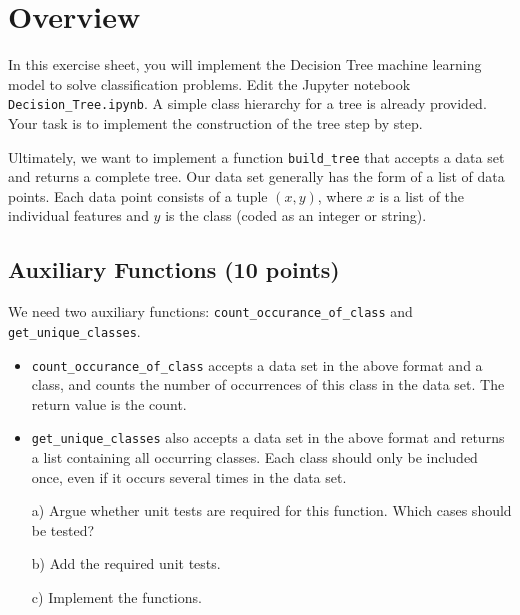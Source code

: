 \def\firstname{Tim}
\def\lastname{Dahmen}
\def\aufgabenblatt{2}




\thispagestyle{page1} 

\section{Overview}

In this exercise sheet, you will implement the Decision Tree machine learning model to solve classification problems. 
Edit the Jupyter notebook \texttt{Decision\_Tree.ipynb}. A simple class hierarchy for a tree is already provided.
Your task is to implement the construction of the tree step by step. 

Ultimately, we want to implement a function \texttt{build\_tree} that accepts a data set and returns a complete tree. 
Our data set generally has the form of a list of data points. Each data point consists of a tuple $(x,y)$, where $x$ is a list of the individual features and $y$ is the class (coded as an integer or string). 

\subsection{Auxiliary Functions (10 points)}

We need two auxiliary functions: \texttt{count\_occurance\_of\_class} and \texttt{get\_unique\_classes}. 

\begin{itemize}
\item \texttt{count\_occurance\_of\_class} accepts a data set in the above format and a class, and counts the number of occurrences of this class in the data set. The return value is the count.
\item \texttt{get\_unique\_classes} also accepts a data set in the above format and returns a list containing all occurring classes. Each class should only be included once, even if it occurs several times in the data set. 
\end{itemize}

\begin{enumerate}

\item[a)] Argue whether unit tests are required for this function. Which cases should be tested?

\item[b)] Add the required unit tests.

\item[c)] Implement the functions.

\end{enumerate}

